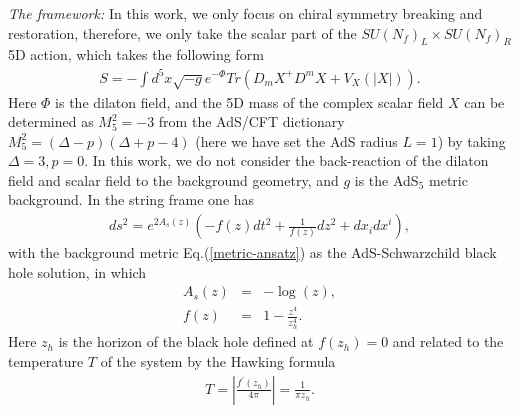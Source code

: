 \documentclass[aps,prd,showpacs,preprintnumbers,twocolumn]{revtex4}
\begin{document}
{\it The framework:} In this work, we only focus on chiral symmetry breaking and restoration, therefore, we only take the scalar part of the
$SU(N_f)_L\times SU(N_f)_R$ 5D action, which takes the following form
\begin{eqnarray}\label{action}
 S=-\int d^5x
 \sqrt{-g}e^{-\Phi}Tr(D_m X^+ D^m X+V_X(|X|)).
\end{eqnarray}
Here $\Phi$ is the dilaton field, and the 5D mass of the complex scalar field $X$ can be determined as $M_5^2=-3$ from the AdS/CFT dictionary $M_5^2=(\Delta-p)(\Delta+p-4)$\cite{Witten:1998qj} (here we have set the AdS radius $L=1$)  by taking $\Delta=3, p=0$.
In this work, we do not consider the back-reaction of the dilaton field and scalar field to the background geometry, and $g$ is the AdS$_5$ metric
background. In the string frame one has
\begin{eqnarray}\label{metric-ansatz}
d s^2=e^{2A_s(z)}(-f(z) d t^2+\frac{1}{f(z)}d z^2+dx_i dx^i),
\end{eqnarray}
with the background metric Eq.(\ref{metric-ansatz}) as the AdS-Schwarzchild black hole solution, in which
\begin{eqnarray}
A_s(z)&=&-\log(z),\label{adsas}\\
f(z)&=&1-\frac{z^4}{z_h^4}.\label{adsf}
\end{eqnarray}
Here $z_h$ is the horizon of the black hole defined at $f(z_h)=0$ and related to the temperature $T$ of the system by the Hawking formula
\begin{eqnarray}
T=|\frac{f^{'}(z_h)}{4\pi}|=\frac{1}{\pi z_h}.
\end{eqnarray}
\end{document}
